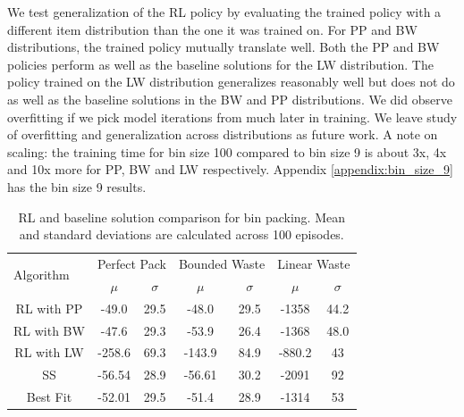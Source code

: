 We test generalization of the RL policy by evaluating the trained policy with a different item distribution than the one it was trained on. For PP and BW distributions, the trained policy mutually translate well. Both the PP and BW policies perform as well as the baseline solutions for the LW distribution. The policy trained on the LW distribution generalizes reasonably well but does not do as well as the baseline solutions in the BW and PP distributions. We did observe overfitting if we pick model iterations from much later in training. We leave study of overfitting and generalization across distributions as future work. A note on scaling: the training time for bin size 100 compared to bin size 9 is about 3x, 4x and 10x more for PP, BW and LW respectively. Appendix \ref{appendix:bin_size_9} has the bin size 9 results.

\begin{table}[h!]
	\resizebox{\columnwidth}{!}
	{%
		\begin{tabular}{|c|cc|cc|cc|}
			\hline
			\multicolumn{1}{|l|}{\multirow{2}{*}{Algorithm}}  & \multicolumn{2}{c|}{Perfect Pack} & \multicolumn{2}{c|}{Bounded Waste}	& \multicolumn{2}{c|}{Linear Waste} \\
			\multicolumn{1}{|l|}{} 											&   $\mu$            &        $\sigma$		& 	$\mu$    			& 	$\sigma$     		 &     $\mu$        &      $\sigma$          \\ \hline
			RL with PP  										  & -49.0     		   &          29.5        	&  	-48.0 	  			  &   29.5	 				 &     -1358       &      44.2     \\ \hline
			RL with BW  									  & -47.6     		   &          29.3        	&  	-53.9 	  			  &   26.4	 				 &     -1368       &      48.0     \\ \hline
			RL with LW 										 &  -258.6     		  &         69.3           &  	-143.9 	  			&   84.9	 			   &     -880.2      &      43     \\ \hline
			SS  											   &  -56.54     	    &         28.9           &    -56.61 	  			&   30.2	 			   &     -2091      &      92     \\ \hline
			Best Fit  															  &  -52.01     	   &          29.5           &  	-51.4 	  			&   28.9	 			   &     -1314     &      53     \\ \hline
		\end{tabular}
	}
	\caption{RL and baseline solution comparison for bin packing. Mean and standard deviations are calculated across 100 episodes.}
	\label{table:bin_packing_RL_baseline_comp}
		\vspace{-1em}
\end{table}

